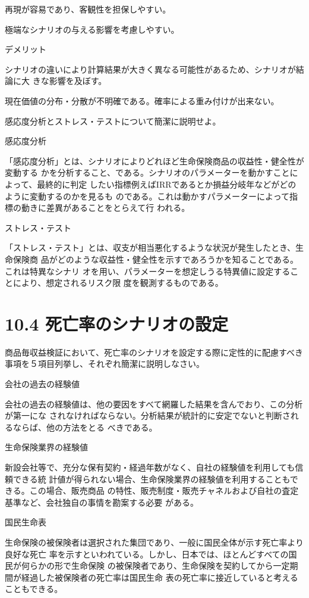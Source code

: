 \documentclass[report,gutter=10mm,fore-edge=10mm,uplatex,dvipdfmx]{jlreq}
\begin{document}
再現が容易であり、客観性を担保しやすい。

極端なシナリオの与える影響を考慮しやすい。

デメリット

シナリオの違いにより計算結果が大きく異なる可能性があるため、シナリオが結論に大
きな影響を及ぼす。

現在価値の分布・分散が不明確である。確率による重み付けが出来ない。


感応度分析とストレス・テストについて簡潔に説明せよ。

\answer{}

感応度分析

「感応度分析」とは、シナリオによりどれほど生命保険商品の収益性・健全性が変動する
かを分析すること、である。シナリオのパラメーターを動かすことによって、最終的に判定
したい指標例えばIRRであるとか損益分岐年などがどのように変動するのかを見るも
のである。これは動かすパラメーターによって指標の動きに差異があることをとらえて行
われる。

ストレス・テスト

「ストレス・テスト」とは、収支が相当悪化するような状況が発生したとき、生命保険商
品がどのような収益性・健全性を示すであろうかを知ることである。これは特異なシナリ
オを用い、パラメーターを想定しうる特異値に設定することにより、想定されるリスク限
度を観測するものである。


\section{10.4 死亡率のシナリオの設定}
商品毎収益検証において、死亡率のシナリオを設定する際に定性的に配慮すべき事項を５項目列挙し、それぞれ簡潔に説明しなさい。
\answer{}

会社の過去の経験値

会社の過去の経験値は、他の要因をすべて網羅した結果を含んでおり、この分析が第一にな
されなければならない。分析結果が統計的に安定でないと判断されるならば、他の方法をとる
べきである。

生命保険業界の経験値

新設会社等で、充分な保有契約・経過年数がなく、自社の経験値を利用しても信頼できる統
計値が得られない場合、生命保険業界の経験値を利用することもできる。この場合、販売商品
の特性、販売制度・販売チャネルおよび自社の査定基準など、会社独自の事情を勘案する必要
がある。

国民生命表

生命保険の被保険者は選択された集団であり、一般に国民全体が示す死亡率より良好な死亡
率を示すといわれている。しかし、日本では、ほとんどすべての国民が何らかの形で生命保険
の被保険者であり、生命保険を契約してから一定期間が経過した被保険者の死亡率は国民生命
表の死亡率に接近していると考えることもできる。
\end{document}
